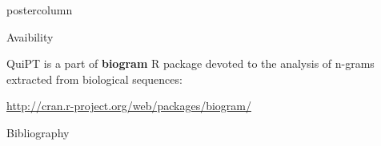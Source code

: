 \documentclass[final]{beamer}\usepackage[]{graphicx}\usepackage[]{color}
\begin{document}
\begin{frame}
\begin{columns}
\begin{column}{.54\textwidth}
\begin{beamercolorbox}[center,wd=\textwidth]{postercolumn}
\begin{minipage}[T]{.95\textwidth}
{        \begin{block}{Avaibility}
        \footnotesize{
      
      QuiPT is a part of \textbf{biogram} R package devoted to the analysis of n-grams extracted from biological sequences: 
      
      \url{http://cran.r-project.org/web/packages/biogram/}
        }
    \end{block}
    \vfill 
     
     
    \begin{block}{Bibliography}
    \tiny{
      
      
    }
    \end{block}
    \vfill
            }
        \end{minipage}
      \end{beamercolorbox}
    \end{column}
  \end{columns}  
\end{frame}
\end{document}
